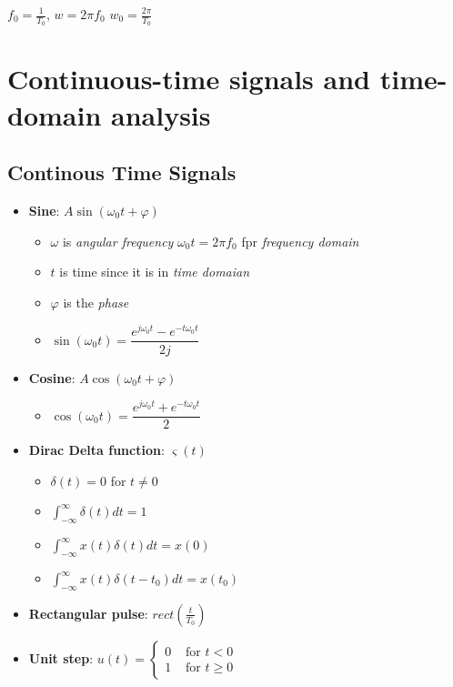 $f_0=\frac{1}{T_0}$, $w=2\pi f_0$
$w_0=\frac{2\pi}{T_0}$

\newpage

\section{Continuous-time signals and time-domain analysis}

\subsection{Continous Time Signals}
\begin{itemize}
    \item \textbf{Sine}: $A\sin(\omega_0t+\varphi)$
    \begin{itemize}
        \item $\omega$ is \textit{angular frequency} $\omega_0t=2\pi f_0$ fpr \textit{frequency domain}
        \item $t$ is time since it is in \textit{time domaian}
        \item $\varphi$ is the \textit{phase}
        \item $\sin(\omega_0t)=\dfrac{e^{j\omega_0t}-e^{-t\omega_0t}}{2j}$
    \end{itemize}
    \item \textbf{Cosine}: $A\cos(\omega_0t+\varphi)$
    \begin{itemize}
        \item $\cos(\omega_0t)=\dfrac{e^{j\omega_0t}+e^{-t\omega_0t}}{2}$
    \end{itemize}
    \item \textbf{Dirac Delta function}: $\varsigma(t)$
    \begin{itemize}
        \item $\delta(t)=0$ for $t\neq 0$
        \item $\int_{-\infty}^{\infty}\delta(t)dt=1$
        \item $\int_{-\infty}^{\infty} x(t)\delta(t)dt=x(0)$
        \item $\int_{-\infty}^{\infty} x(t)\delta(t-t_0)dt=x(t_0)$
    \end{itemize}
    \item \textbf{Rectangular pulse}: $rect(\frac{t}{T_0})$
    \item \textbf{Unit step}: $u(t)=\left\{\begin{array}{ll}0 & \text { for } t<0 \\ 1 & \text { for } t \geq 0\end{array}\right.$%

\end{itemize}
